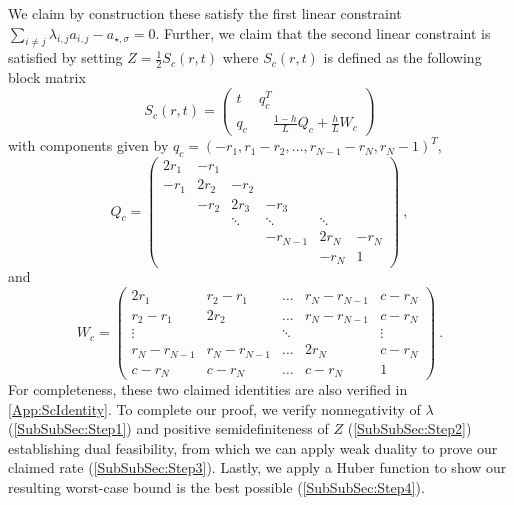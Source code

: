 \documentclass[11pt]{article}
\numberwithin{equation}{section}
\theoremstyle{definition}
\theoremstyle{definition}
\theoremstyle{definition}
\newcommand{\1}{\mathbf{1}}
\newcommand{\idxSpecial}{\sigma}
\begin{document}
We claim by construction these satisfy the first linear constraint $\sum_{i\neq j} \lambda_{i,j} a_{i,j} - a_{\star,\idxSpecial} = 0$.
Further, we claim that the second linear constraint is satisfied by setting $Z = \frac{1}{2}S_c(r,t)$ where $S_c(r,t)$ is defined as the following block matrix
\begin{equation}\label{Eqn:SMatrix}
    S_c(r,t) = \begin{pmatrix}
        t & q_c^T \\
        q_c & \quad \frac{1-h}{L}Q_c + \frac{h}{L}W_c
    \end{pmatrix}
\end{equation}
with components given by $q_c = (-r_1, r_1-r_2, \dots, r_{N-1}-r_N, r_N-1)^T$,
\begin{equation}
    Q_c = \begin{pmatrix} \label{Eqn:Mat0Def}
        2r_1 & -r_1 \\
        -r_1 & 2r_2 & -r_2 \\
        & -r_2 & 2r_3 & -r_3 \\
        & & \ddots & \ddots & \ddots \\
        & & & -r_{N-1} & 2r_N & -r_N \\
        & & & & -r_N & 1
    \end{pmatrix} \ , 
\end{equation}
and
\begin{equation}\label{Eqn:Mat1Def}
    W_c = \begin{pmatrix}
        2r_1 & r_2-r_1 & \dots & r_N-r_{N-1} & c-r_N\\
        r_2-r_1 & 2 r_2 & \dots & r_N-r_{N-1} & c-r_N \\
        \vdots & & \ddots & & \vdots \\
        r_N-r_{N-1} & r_N-r_{N-1} & \dots & 2r_N & c-r_N \\
        c-r_N & c-r_N & \dots & c-r_N & 1
    \end{pmatrix} \ . 
\end{equation}
For completeness, these two claimed identities are also verified in \cref{App:ScIdentity}. To complete our proof, we verify nonnegativity of $\lambda$ (\cref{SubSubSec:Step1}) and positive semidefiniteness of $Z$ (\cref{SubSubSec:Step2}) establishing dual feasibility, from which we can apply weak duality to prove our claimed rate (\cref{SubSubSec:Step3}). Lastly, we apply a Huber function to show our resulting worst-case bound is the best possible (\cref{SubSubSec:Step4}).
\end{document}
